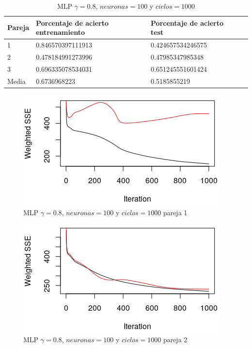 \documentclass[11pt,spanish,listoffigures,listoftables]{workluis}
\begin{document}
\begin{table}[H]
\centering
\caption{MLP $\gamma = 0.8$, $neuronas = 100$ y $ciclos = 1000$}
\label{tb:tb6}
\begin{tabular}{lllll}
\hline
\multicolumn{1}{|l|}{Pareja} & Porcentaje de acierto entrenamiento & Porcentaje de acierto test  \\ \hline \hline
1                            & 0.846570397111913    & 0.424657534246575 \\
2                            & 0.478184991273996    & 0.47985347985348  \\
3                            & 0.696335078534031    & 0.651245551601424 \\
Media                        & 0.6736968223         & 0.5185855219      \\ \hline
\end{tabular}
\end{table}

\begin{figure}[H]
\centering
\includegraphics[scale=0.5]{081001}
\caption{MLP $\gamma = 0.8$, $neuronas = 100$ y $ciclos = 1000$ pareja 1}
\end{figure} 

\begin{figure}[H]
\centering
\includegraphics[scale=0.5]{081002}
\caption{MLP $\gamma = 0.8$, $neuronas = 100$ y $ciclos = 1000$ pareja 2}
\end{figure} 
\end{document}

